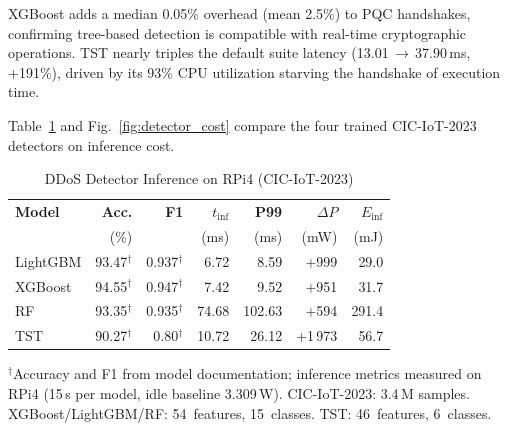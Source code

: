 XGBoost adds a median 0.05\% overhead (mean 2.5\%) to PQC handshakes,
confirming tree-based detection is compatible with real-time
cryptographic operations.  TST nearly triples the default suite
latency (13.01\,$\to$\,37.90\,ms, +191\%), driven by its 93\% CPU
utilization starving the handshake of execution time.

Table~\ref{tab:detector_compare} and Fig.~\ref{fig:detector_cost}
compare the four trained CIC-IoT-2023 detectors on inference cost.

\begin{table}[t]
\centering
\caption{DDoS Detector Inference on RPi4 (CIC-IoT-2023)}
\label{tab:detector_compare}
\footnotesize
\begin{tabular}{@{}lrrrrrr@{}}
\toprule
\textbf{Model} &
  \textbf{Acc.} & \textbf{F1} &
  \textbf{$t_\text{inf}$} & \textbf{P99} &
  \textbf{$\Delta P$} & \textbf{$E_\text{inf}$} \\
& (\%) & & (ms) & (ms) & (mW) & (mJ) \\
\midrule
LightGBM & 93.47$^\dagger$ & 0.937$^\dagger$ & 6.72  & 8.59   & +999  & 29.0  \\
XGBoost  & 94.55$^\dagger$ & 0.947$^\dagger$ & 7.42  & 9.52   & +951  & 31.7  \\
RF       & 93.35$^\dagger$ & 0.935$^\dagger$ & 74.68 & 102.63 & +594  & 291.4 \\
TST      & 90.27$^\dagger$ & 0.80$^\dagger$  & 10.72 & 26.12  & +1\,973 & 56.7 \\
\bottomrule
\end{tabular}
\begin{tablenotes}
\footnotesize
\item $^\dagger$Accuracy and F1 from model documentation; inference
  metrics measured on RPi4 (15\,s per model, idle baseline 3.309\,W).
  CIC-IoT-2023: 3.4\,M samples.
  XGBoost/LightGBM/RF: 54~features, 15~classes.
  TST: 46~features, 6~classes.
\end{tablenotes}
\end{table}

